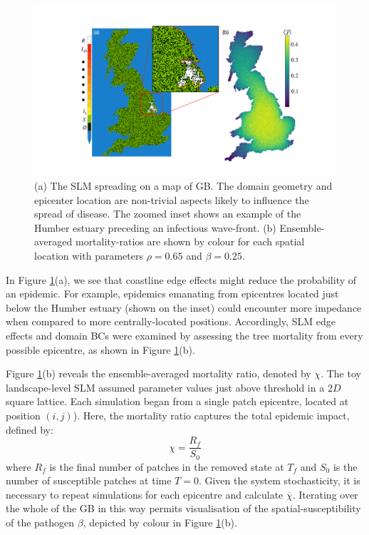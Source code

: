 \begin{figure}
    \centering
    \includegraphics[scale=0.32]{chapter4/figures/figure1-GB-BCs.pdf}
    \caption{(a) The SLM spreading on a map of GB. The domain geometry and epicenter %
    location are non-trivial aspects likely to influence the spread of disease. The zoomed inset %
    shows an example of the Humber estuary preceding an infectious wave-front. 
    (b) Ensemble-averaged mortality-ratios are shown by colour for each spatial location with 
        parameters $\rho=0.65$ and $\beta=0.25$.}
    \label{fig:uk-spread-primer}
\end{figure}

In Figure \ref{fig:uk-spread-primer}(a), we see that coastline edge effects
might reduce the probability of an epidemic.
For example, epidemics emanating from epicentres located just below the 
Humber estuary (shown on the inset) could encounter more impedance when 
compared to more centrally-located positions.
Accordingly, SLM edge effects and domain BCs were examined by assessing the 
tree mortality from every possible epicentre, as shown in Figure \ref{fig:uk-spread-primer}(b).

Figure \ref{fig:uk-spread-primer}(b) reveals the ensemble-averaged mortality 
ratio, denoted by $\chi$.
The toy landscape-level SLM assumed parameter values just above threshold in a $2D$ square lattice. 
Each simulation began from a single patch epicentre, located at position $(i, j)$).
Here, the mortality ratio captures the total epidemic impact, defined by: 
\begin{equation}
\label{eq:epi_impact}
    \chi=\frac{R_f}{S_0}
\end{equation}
where $R_f$ is the final number of patches in the removed state at $T_f$ and $S_0$ is the number of susceptible %
patches at time $T=0$.
Given the system stochasticity, it is necessary to repeat simulations for each epicentre %
and calculate $\overline{\chi}$. Iterating over the whole of the GB in this way permits visualisation
of the spatial-susceptibility of the pathogen $\beta$, depicted by colour in Figure \ref{fig:uk-spread-primer}(b).

